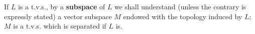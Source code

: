 If $L$ is a t.v.s., by a \textbf{subspace} of $L$ we shall understand (unless the contrary is expressly stated) a vector subspace $M$ endowed with the topology induced by $L$; $M$ is a t.v.s. which is separated if $L$ is.
